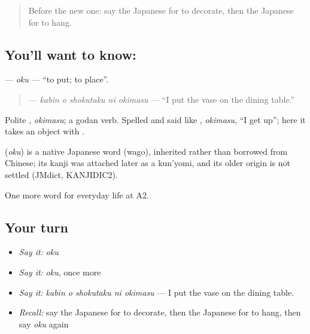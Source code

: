 \label{lesson:JA-C157-oku}



\begin{quote}
Before the new one: say the Japanese for to decorate, then the Japanese for to hang.
\end{quote}

\subsection*{You'll want to know: }
\textbf{} — \emph{oku} — \textquotedblleft{}to put; to place\textquotedblright{}.

\begin{quote}
\textbf{  } — \emph{kabin o shokutaku ni okimasu} — \textquotedblleft{}I put the vase on the dining table.\textquotedblright{}
\end{quote}

Polite \textbf{}, \emph{okimasu}; a godan verb. Spelled and said like \textbf{}, \emph{okimasu}, \textquotedblleft{}I get up\textquotedblright{}; here it takes an object with \textbf{}.

\begin{cousinweb}
\textbf{} (\emph{oku}) is a native Japanese word (wago), inherited rather than borrowed from Chinese; its kanji was attached later as a kun'yomi, and its older origin is not settled (JMdict, KANJIDIC2).
\end{cousinweb}

\begin{grammarlens}[title={What you've built}]
One more word for everyday life at A2.
\end{grammarlens}

\subsection*{Your turn}
\begin{itemize}
\raggedright
  \item \emph{Say it:} \emph{oku}
  \item \emph{Say it:} \emph{oku}, once more
  \item \emph{Say it:} \emph{kabin o shokutaku ni okimasu} — I put the vase on the dining table.
  \item \emph{Recall:} say the Japanese for to decorate, then the Japanese for to hang, then say \emph{oku} again
\end{itemize}

